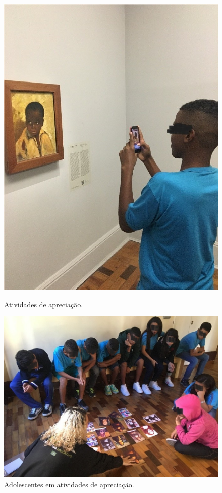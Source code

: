\documentclass[portuguese]{textolivre}
\begin{document}
\begin{figure}[htbp]
 \centering
 \begin{minipage}{.9\textwidth}
 \begin{minipage}{.45\textwidth}
 \includegraphics[width=\textwidth]{Imagem1.jpg}
 \caption{Atividades de apreciação.}
 \label{fig1}
 \end{minipage}%
 \qquad
 \begin{minipage}{0.45\textwidth}
 \includegraphics[width=\textwidth]{Imagem2.jpg}
 \caption{Adolescentes em atividades de apreciação.}
 \label{fig2}
 \end{minipage}%
 \end{minipage}
\end{figure}
\end{document}
